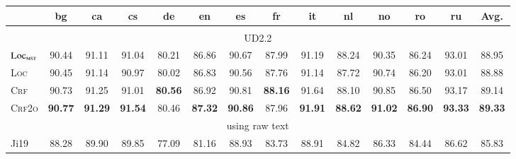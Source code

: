 \begin{table*}[tb]
\setlength{\tabcolsep}{3.4pt}
\centering
\begin{tabular}{lccccccccccccc}
\toprule
& bg & ca & cs & de & en & es & fr & it & nl & no & ro & ru & Avg.\\[1pt]
\hline
\\[-9pt]
\multicolumn{14}{c}{UD2.2} \\[1pt]
$\textsc{Loc}_{\textsc{mst}}$ &         90.44  &         91.11  &         91.04                   &         80.21                   &         86.86                   &         90.67                   &         87.99  &         91.19                    &         88.24                    &         90.35                   &         86.24                    &         93.01                    &         88.95 \\
\textsc{Loc}                  &         90.45  &         91.14  &         90.97                   &         80.02                   &         86.83                   &         90.56                   &         87.76  &         91.14                    &         87.72                    &         90.74                   &         86.20                    &         93.01                    &         88.88 \\
\textsc{Crf}                  &         90.73  &         91.25  &         91.01                   & \textbf{80.56}\rlap{$^\dagger$} &         86.92                   &         90.81\rlap{$^\dagger$}  & \textbf{88.16} &         91.64\rlap{$^\dagger$}   &         88.10                    &         90.85                   &         86.50                    &         93.17\rlap{$^\dagger$}   &         89.14\rlap{$^\ddagger$} \\
\textsc{Crf2o}                & \textbf{90.77} & \textbf{91.29} & \textbf{91.54}\rlap{$^\dagger$} &         80.46                   & \textbf{87.32}\rlap{$^\dagger$} & \textbf{90.86}\rlap{$^\dagger$} &         87.96  & \textbf{91.91}\rlap{$^\ddagger$} & \textbf{88.62}\rlap{$^\ddagger$} & \textbf{91.02}\rlap{$^\dagger$} & \textbf{86.90}\rlap{$^\ddagger$} & \textbf{93.33}\rlap{$^\ddagger$} & \textbf{89.33}\rlap{$^\ddagger$} \\[1pt]
\multicolumn{14}{c}{using raw text} \\[1pt]
Ji19           & 88.28 & 89.90 & 89.85 & 77.09 & 81.16 & 88.93 & 83.73 & 88.91 & 84.82 & 86.33 & 84.44 & 86.62 & 85.83 \\

\end{tabular}
\end{table*}
